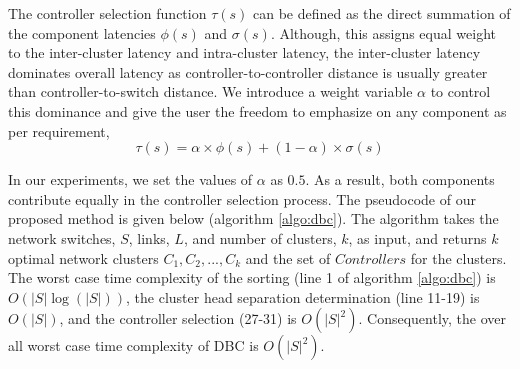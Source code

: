 \documentclass{IEEEtran}
\begin{document}
	The controller selection function $\tau(s)$ can be defined as the direct summation of the component latencies $\phi(s)$ and $\sigma(s)$. Although, this assigns equal weight to the inter-cluster latency and intra-cluster latency, the inter-cluster latency dominates overall latency as controller-to-controller distance is usually greater than controller-to-switch distance. We introduce a weight variable $\alpha$ to control this dominance and give the user the freedom to emphasize on any component as per requirement,
	\begin{equation} \label{eqn:totlat}
	\tau(s) = \alpha \times \phi(s) + (1-\alpha) \times \sigma(s)
	\end{equation}
	
	In our experiments, we set the values of $\alpha$ as $0.5$. As a result, both components contribute equally in the controller selection process. The pseudocode of our proposed method is given below (algorithm \ref{algo:dbc}). The algorithm takes the network switches, $S$, links, $L$, and number of clusters, $k$, as input, and returns $k$ optimal network clusters $C_1,C_2,...,C_k$ and the set of $Controllers$ for the clusters. The worst case time complexity of the sorting (line 1 of algorithm \ref{algo:dbc}) is $O(|S|\log(|S|))$, the cluster head separation determination (line 11-19) is $O(|S|)$, and the controller selection (27-31) is $O(|S|^2)$. Consequently, the over all worst case time complexity of DBC is $O(|S|^2)$.
	
\end{document}
